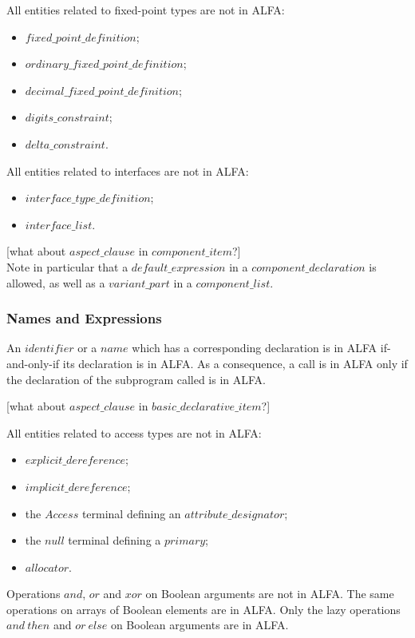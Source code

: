 \documentclass{article}
\newcommand{\bnf}[1]{$\mathit{#1}$}
\begin{document}
All entities related to fixed-point types are not in ALFA:
\begin{itemize}
\item \bnf{fixed\_point\_definition};
\item \bnf{ordinary\_fixed\_point\_definition};
\item \bnf{decimal\_fixed\_point\_definition};
\item \bnf{digits\_constraint};
\item \bnf{delta\_constraint}.
\end{itemize}

All entities related to interfaces are not in ALFA:
\begin{itemize}
\item \bnf{interface\_type\_definition};
\item \bnf{interface\_list}.
\end{itemize}

[what about \bnf{aspect\_clause} in \bnf{component\_item}?]\\

Note in particular that a \bnf{default\_expression} in a
\bnf{component\_declaration} is allowed, as well as a \bnf{variant\_part} in
a \bnf{component\_list}.

\subsubsection{Names and Expressions}

An \bnf{identifier} or a \bnf{name} which has a corresponding declaration is in
ALFA if-and-only-if its declaration is in ALFA. As a consequence, a call is in
ALFA only if the declaration of the subprogram called is in ALFA. 

[what about \bnf{aspect\_clause} in \bnf{basic\_declarative\_item}?]

All entities related to access types are not in ALFA:
\begin{itemize}
\item \bnf{explicit\_dereference};
\item \bnf{implicit\_dereference};
\item the \bnf{Access} terminal defining an \bnf{attribute\_designator};
\item the \bnf{null} terminal defining a \bnf{primary};
\item \bnf{allocator}.
\end{itemize}

Operations \bnf{and}, \bnf{or} and \bnf{xor} on Boolean arguments are not in
ALFA. The same operations on arrays of Boolean elements are in ALFA.  Only the
lazy operations \bnf{and\ then} and \bnf{or\ else} on Boolean arguments are 
in ALFA.
\end{document}
